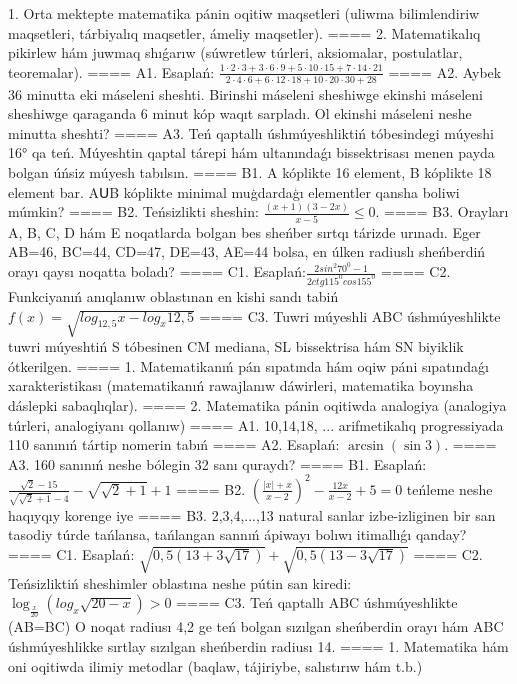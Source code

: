 1. Orta mektepte matematika pánin oqitiw maqsetleri (uliwma bilimlendiriw maqsetleri, tárbiyalıq maqsetler, ámeliy maqsetler).
====
2. Matematikalıq pikirlew hám juwmaq shıǵarıw (súwretlew túrleri, aksiomalar, postulatlar, teoremalar).
====
A1. Esaplań: \(\frac{1 \cdot 2 \cdot 3 + 3 \cdot 6 \cdot 9 + 5 \cdot 10 \cdot 15 + 7 \cdot 14 \cdot 21}{2 \cdot 4 \cdot 6 + 6 \cdot 12 \cdot 18 + 10 \cdot 20 \cdot 30 + 28}\)
====
A2. Aybek 36 minutta eki máseleni sheshti. Birinshi máseleni sheshiwge ekinshi máseleni sheshiwge qaraganda 6 minut kóp waqıt sarpladı. Ol ekinshi máseleni neshe minutta sheshti?
====
A3. Teń qaptallı úshmúyeshliktiń tóbesindegi múyeshi 16° qa teń. Múyeshtin qaptal tárepi hám ultanındaǵı bissektrisası menen payda bolgan úńsiz múyesh tabılsın.
====
B1. A kóplikte 16 element, B kóplikte 18 element bar. AՍB kóplikte minimal muģdardaģı elementler qansha boliwi múmkin?
====
B2. Teńsizlikti sheshin: \(\frac{ (x + 1) (3 - 2x) }{x - 5} \leq 0\).
====
B3. Orayları A, B, C, D hám E noqatlarda bolgan bes sheńber sırtqı tárizde urınadı. Eger AB=46, BC=44, CD=47, DE=43, AE=44 bolsa, en úlken radiuslı sheńberdiń orayı qaysı noqatta boladı?
====
C1. Esaplań:\(\frac{2sin^{2}70^{0} - 1}{2ctg115^{0}cos155^{0}}\)
====
C2. Funkciyanıń anıqlanıw oblastınan en kishi sandı tabiń \(f (x) = \sqrt{log_{12,5}x - log_{x}12,5}\)
====
C3. Tuwri múyeshli ABC úshmúyeshlikte tuwri múyeshtiń S tóbesinen CM mediana, SL bissektrisa hám SN biyiklik ótkerilgen.
====
1. Matematikanıń pán sıpatında hám oqiw páni sıpatındaǵı xarakteristikası (matematikanıń rawajlanıw dáwirleri, matematika boyınsha dáslepki sabaqlıqlar).
====
2. Matematika pánin oqitiwda analogiya (analogiya túrleri, analogiyanı qollanıw)
====
A1. 10,14,18, ... arifmetikalıq progressiyada 110 sanınıń tártip nomerin tabıń
====
A2. Esaplań: \(\arcsin (\sin3 ) \).
====
A3. 160 sanınıń neshe bólegin 32 sanı quraydı?
====
B1. Esaplań: \(\frac{\sqrt{2} - 15}{\sqrt{\sqrt{2} + 1} - 4} - \sqrt{\sqrt{2} + 1} + 1\)
====
B2. $(\frac{|x| + x}{x-2})^{2} - \frac{12x}{x-2} + 5 = 0$ teńleme neshe haqıyqıy korenge iye
====
B3. 2,3,4,...,13 natural sanlar izbe-izliginen bir san tasodiy túrde tańlansa, tańlangan sannıń ápiwayı bolıwı itimallıǵı qanday?
====
C1. Esaplań: \(\sqrt{0,5 (13 + 3\sqrt{17}) } + \sqrt{0,5 (13 - 3\sqrt{17}) }\)
====
C2. Teńsizliktiń sheshimler oblastına neshe pútin san kiredi:\(\log_{\frac{x}{20}} (log_{x}\sqrt{20 - x}) > 0\)
====
C3. Teń qaptallı ABC úshmúyeshlikte (AB=BC) O noqat radiusı 4,2 ge teń bolgan sızılgan sheńberdin orayı hám ABC úshmúyeshlikke sırtlay sızılgan sheńberdin radiusı 14.
====
1. Matematika hám oni oqitiwda ilimiy metodlar (baqlaw, tájiriybe, salıstırıw hám t.b.)
